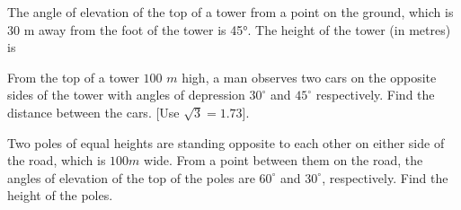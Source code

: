     \item The angle of elevation of the top of a tower from a point on the ground, which is 30 m away from the foot of the tower is 45°. The height of the tower (in metres) is
    \hfill{}\item From the top of a tower $100$ $m$ high, a man observes two cars on the opposite sides of the tower with angles of depression $30^\circ$ and $45^\circ$ respectively. Find the distance between the cars. [Use $\sqrt{3}=1.73$].
    \hfill{}\item Two poles of equal heights are standing opposite to each other on either side of the road, which is $100m$ wide. From a point between them on the road, the angles of elevation of the top of the poles are $60^\circ$ and $30^\circ$, respectively. Find the height of the poles.
\hfill{}
